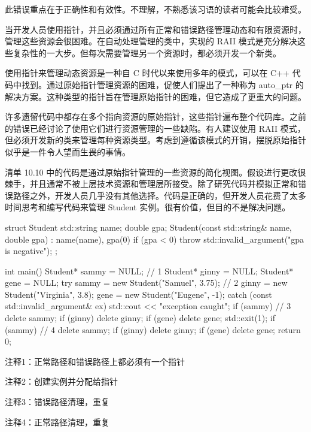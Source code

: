 此错误重点在于正确性和有效性。不理解，不熟悉该习语的读者可能会比较难受。

当开发人员使用指针，并且必须通过所有正常和错误路径管理动态和有限资源时，管理这些资源会很困难。在自动处理管理的类中，实现的 RAII 模式是充分解决这些复杂性的一大步。但每次需要管理另一个资源时，都必须开发一个新类。

使用指针来管理动态资源是一种自 C 时代以来使用多年的模式，可以在 C++ 代码中找到。通过原始指针管理资源的困难，促使人们提出了一种称为 auto\_ptr 的解决方案。这种类型的指针旨在管理原始指针的困难，但它造成了更重大的问题。


许多遗留代码中都存在多个指向资源的原始指针，这些指针遍布整个代码库。之前的错误已经讨论了使用它们进行资源管理的一些缺陷。有人建议使用 RAII 模式，但必须开发新的类来管理每种资源类型。考虑到遵循该模式的开销，摆脱原始指针似乎是一件令人望而生畏的事情。

清单 10.10 中的代码是通过原始指针管理的一些资源的简化视图。假设进行更改很棘手，并且通常不被上层技术资源和管理层所接受。除了研究代码并模拟正常和错误路径之外，开发人员几乎没有其他选择。代码是正确的，但开发人员花费了太多时间思考和编写代码来管理 Student 实例。很有价值，但目的不是解决问题。


\begin{cpp}
struct Student {
  std::string name;
  double gpa;
  Student(const std::string& name, double gpa) : name(name), gpa(0) {
    if (gpa < 0)
      throw std::invalid_argument("gpa is negative");
  }
};

int main() {
  Student* sammy = NULL; // 1
  Student* ginny = NULL;
  Student* gene = NULL;
  try {
    sammy = new Student("Samuel", 3.75); // 2
    ginny = new Student("Virginia", 3.8);
    gene = new Student("Eugene", -1);
  } catch (const std::invalid_argument& ex) {
    std::cout << "exception caught\n";
    if (sammy) // 3
      delete sammy;
    if (ginny)
      delete ginny;
    if (gene)
      delete gene;
    std::exit(1);
  }
  if (sammy) // 4
    delete sammy;
  if (ginny)
    delete ginny;
  if (gene)
    delete gene;
  return 0;
}
\end{cpp}

{\footnotesize
注释1：正常路径和错误路径上都必须有一个指针

注释2：创建实例并分配给指针

注释3：错误路径清理，重复

注释4：正常路径清理，重复
}

